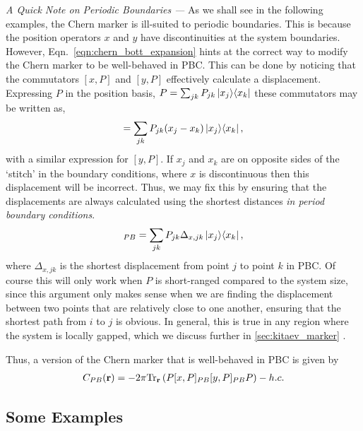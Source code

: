\begin{shaded}
	\textit{A Quick Note on Periodic Boundaries --- } As we shall see in the following examples, the Chern marker is ill-suited to periodic boundaries. This is because the position operators $x$ and $y$ have discontinuities at the system boundaries. However, Eqn.~\ref{eqn:chern_bott_expansion} hints at the correct way to modify the Chern marker to be well-behaved in PBC. This can be done by noticing that the commutators $[x,P]$ and $[y,P]$ effectively calculate a displacement. Expressing $P$ in the position basis, $P = \sum_{jk} P_{jk}\ket{x_j}\!\bra{x_k}$ these commutators may be written as,
	\begin{align}
		[x, P] = \sum_{jk} P_{jk}(x_j - x_k) \ketbra{x_j}{x_k},
	\end{align}
	with a similar expression for $[y,P]$. If $x_j$ and $x_k$ are on opposite sides of the `stitch' in the boundary conditions, where $x$ is discontinuous then this displacement will be incorrect. Thus, we may fix this by ensuring that the displacements are always calculated using the shortest distances \textit{in period boundary conditions}. 
	\begin{align}
		[x, P]_{PB} = \sum_{jk} P_{jk} \Delta_{x, jk} \ketbra{x_j}{x_k},
	\end{align}
	where $\Delta_{x, jk}$ is the shortest displacement from point $j$ to point $k$ in PBC. Of course this will only work when $P$ is short-ranged compared to the system size, since this argument only makes sense when we are finding the displacement between two points that are relatively close to one another, ensuring that the shortest path from $i$ to $j$ is obvious. In general, this is true in any region where the system is locally gapped, which we discuss further in \textsection\ref{sec:kitaev_marker} \cite{hastings_spectral_2006}.
	
	Thus, a version of the Chern marker that is well-behaved in PBC is given by 
	\begin{align}  \label{eqn:pbc_chern_marker}
		C_{PB}(\textbf r) = - 2\pi \textup{Tr}_{\textbf r} 
		\left (
		P[x,P]_{PB}[y,P]_{PB}P 
		\right ) 
		- h.c.
	\end{align}
\end{shaded}

\subsection{Some Examples}

